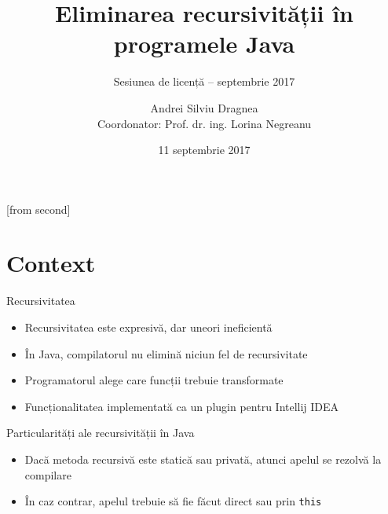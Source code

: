 \documentclass{beamer}
\title[Eliminarea recursivității în programele Java]{Eliminarea recursivității în programele Java}
\subtitle{Sesiunea de licență -- septembrie 2017}
\institute{Facultatea de Automatică și Calculatoare,\\
	Universitatea POLITEHNICA București}
\author[Andrei Silviu Dragnea]{Andrei Silviu Dragnea\\
	Coordonator: Prof. dr. ing. Lorina Negreanu}
\date{11 septembrie 2017}
\def\code#1{\texttt{#1}}
\begin{document}
[from second]


\frame{\titlepage}


\section{Context}

\begin{frame}{Recursivitatea}
    \begin{itemize}
        \item Recursivitatea este expresivă, dar uneori ineficientă
        \item În Java, compilatorul nu elimină niciun fel de recursivitate
        \item Programatorul alege care funcții trebuie transformate
        \item Funcționalitatea implementată ca un plugin pentru Intellij IDEA
    \end{itemize}
\end{frame}

\begin{frame}{Particularități ale recursivității în Java}
    \begin{itemize}
        \item Dacă metoda recursivă este statică sau privată, atunci apelul se rezolvă la compilare
        \item În caz contrar, apelul trebuie să fie făcut direct sau prin \code{this}
    \end{itemize}
\end{frame}
\end{document}
